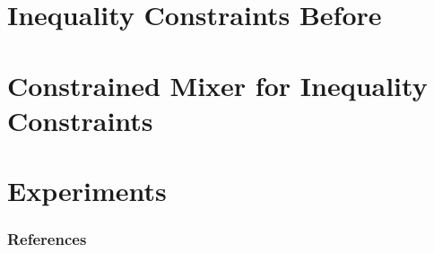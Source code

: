 \documentclass[aspectratio=169]{beamer}
\begin{document}
\section{Inequality Constraints Before}


\section{Constrained Mixer for Inequality Constraints}


\section{Experiments}

\begin{frame}[allowframebreaks]
    \frametitle{References}
    \printbibliography[heading=none]
\end{frame}
\end{document}
